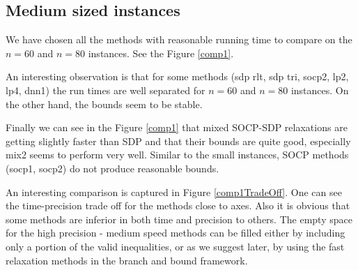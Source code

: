 \documentclass[12pt]{book}
\theoremstyle{definition}
\begin{document}
\subsection{Medium sized instances}

We have chosen all the methods with reasonable running time to compare on the $n=60$ and $n=80$ instances. See the Figure \ref{comp1}.

An interesting observation is that for some methods (sdp rlt, sdp tri, socp2, lp2, lp4, dnn1) the run times are well separated for $n=60$ and $n=80$ instances. On the other hand, the bounds seem to be stable.

Finally we can see in the Figure \ref{comp1} that mixed SOCP-SDP relaxations are getting slightly faster than SDP and that their bounds are quite good, especially mix2 seems to perform very well. 
Similar to the small instances, SOCP methods (socp1, socp2) do not produce reasonable bounds. 

An interesting comparison is captured in Figure \ref{comp1TradeOff}.
One can see the time-precision trade off for the methods close to axes. Also it is obvious that some methods are inferior in both time and precision to others.
The empty space for the high precision - medium speed methods can be filled either by including only a portion of the valid inequalities, or as we suggest later, by using the fast relaxation methods in the branch and bound framework.
\end{document}
